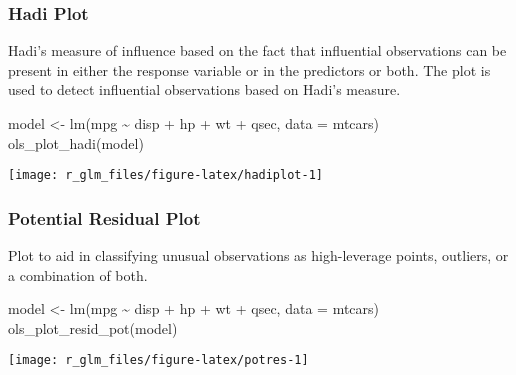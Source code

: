 \documentclass[
]{article}
\newenvironment{Shaded}{\begin{snugshade}}{\end{snugshade}}
\newcommand{\AttributeTok}[1]{\textcolor[rgb]{0.77,0.63,0.00}{#1}}
\newcommand{\FunctionTok}[1]{\textcolor[rgb]{0.00,0.00,0.00}{#1}}
\newcommand{\NormalTok}[1]{#1}
\newcommand{\OtherTok}[1]{\textcolor[rgb]{0.56,0.35,0.01}{#1}}
\newcommand{\SpecialCharTok}[1]{\textcolor[rgb]{0.00,0.00,0.00}{#1}}
\begin{document}
\hypertarget{hadi-plot}{%
\subsubsection{Hadi Plot}\label{hadi-plot}}

Hadi's measure of influence based on the fact that influential
observations can be present in either the response variable or in the
predictors or both. The plot is used to detect influential observations
based on Hadi's measure.

\begin{Shaded}
\begin{Highlighting}[]
\NormalTok{model }\OtherTok{\textless{}{-}} \FunctionTok{lm}\NormalTok{(mpg }\SpecialCharTok{\textasciitilde{}}\NormalTok{ disp }\SpecialCharTok{+}\NormalTok{ hp }\SpecialCharTok{+}\NormalTok{ wt }\SpecialCharTok{+}\NormalTok{ qsec, }\AttributeTok{data =}\NormalTok{ mtcars)}
\FunctionTok{ols\_plot\_hadi}\NormalTok{(model)}
\end{Highlighting}
\end{Shaded}

\begin{center}\texttt{[image: r\_glm\_files/figure-latex/hadiplot-1]} \end{center}

\hypertarget{potential-residual-plot}{%
\subsubsection{Potential Residual Plot}\label{potential-residual-plot}}

Plot to aid in classifying unusual observations as high-leverage points,
outliers, or a combination of both.

\begin{Shaded}
\begin{Highlighting}[]
\NormalTok{model }\OtherTok{\textless{}{-}} \FunctionTok{lm}\NormalTok{(mpg }\SpecialCharTok{\textasciitilde{}}\NormalTok{ disp }\SpecialCharTok{+}\NormalTok{ hp }\SpecialCharTok{+}\NormalTok{ wt }\SpecialCharTok{+}\NormalTok{ qsec, }\AttributeTok{data =}\NormalTok{ mtcars)}
\FunctionTok{ols\_plot\_resid\_pot}\NormalTok{(model)}
\end{Highlighting}
\end{Shaded}

\begin{center}\texttt{[image: r\_glm\_files/figure-latex/potres-1]} \end{center}
\end{document}
